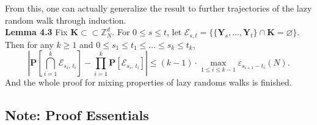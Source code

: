 \documentclass[
11pt, %
a4paper, %
oneside, %
headinclude,footinclude, %
BCOR5mm, %
]{scrartcl}
\begin{document}
\noindent From this, one can actually generalize the result to further trajectories of the lazy random walk through induction.
\vspace{0.6em}\\\textbf{Lemma 4.3} Fix $\mathbf{K}\subset\subset \mathbb{Z}_N^d$. For $0 \leq s \leq t$, let $\mathscr{E}_{s,t} = \{ \{ \mathbf{Y}_s,\dots,\mathbf{Y}_t\} \cap \mathbf{K} = \varnothing\}$. Then for any $k \geq 1$ and $0 \leq s_1 \leq t_1 \leq \dots \leq s_k \leq t_k$,
\begin{equation}
    \left| \mathbf{P} \left[ \bigcap_{i=1}^k \mathscr{E}_{s_i,\ t_i}\right]-\prod_{i=1}^k \mathbf{P}[\mathscr{E}_{s_i,\ t_i}]\right| \leq (k-1) \cdot \max_{1 \leq i \leq k-1} \varepsilon_{s_{i+1}-t_i}(N). \tag{4.9}
\end{equation}
And the whole proof for mixing properties of lazy randoms walks is finished. 
\subsection{Note: Proof Essentials}
\end{document}
